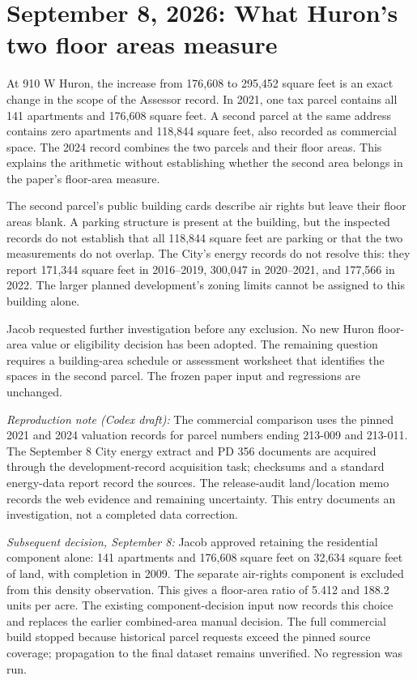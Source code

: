 \section*{September 8, 2026: What Huron's two floor areas measure}

At 910 W Huron, the increase from 176,608 to 295,452 square feet is an exact change in the scope of the Assessor record. In 2021, one tax parcel contains all 141 apartments and 176,608 square feet. A second parcel at the same address contains zero apartments and 118,844 square feet, also recorded as commercial space. The 2024 record combines the two parcels and their floor areas. This explains the arithmetic without establishing whether the second area belongs in the paper's floor-area measure.

The second parcel's public building cards describe air rights but leave their floor areas blank. A parking structure is present at the building, but the inspected records do not establish that all 118,844 square feet are parking or that the two measurements do not overlap. The City's energy records do not resolve this: they report 171,344 square feet in 2016--2019, 300,047 in 2020--2021, and 177,566 in 2022. The larger planned development's zoning limits cannot be assigned to this building alone.

Jacob requested further investigation before any exclusion. No new Huron floor-area value or eligibility decision has been adopted. The remaining question requires a building-area schedule or assessment worksheet that identifies the spaces in the second parcel. The frozen paper input and regressions are unchanged.

\smallskip
\noindent\textit{Reproduction note (Codex draft):} The commercial comparison uses the pinned 2021 and 2024 valuation records for parcel numbers ending 213-009 and 213-011. The September 8 City energy extract and PD 356 documents are acquired through the development-record acquisition task; checksums and a standard energy-data report record the sources. The release-audit land/location memo records the web evidence and remaining uncertainty. This entry documents an investigation, not a completed data correction.

\smallskip
\noindent\textit{Subsequent decision, September 8:} Jacob approved retaining the residential component alone: 141 apartments and 176,608 square feet on 32,634 square feet of land, with completion in 2009. The separate air-rights component is excluded from this density observation. This gives a floor-area ratio of 5.412 and 188.2 units per acre. The existing component-decision input now records this choice and replaces the earlier combined-area manual decision. The full commercial build stopped because historical parcel requests exceed the pinned source coverage; propagation to the final dataset remains unverified. No regression was run.
